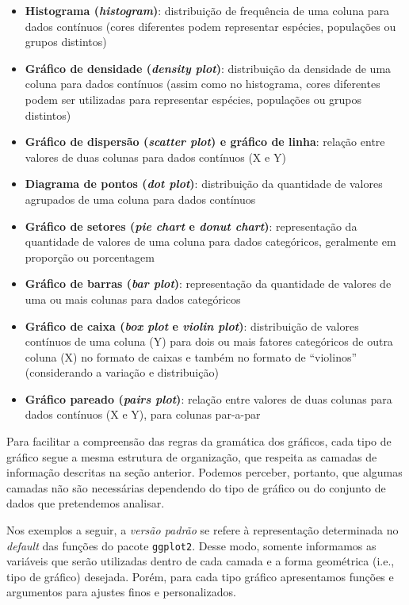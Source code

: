 \documentclass[
]{article}
\providecommand{\tightlist}{%
  \setlength{\itemsep}{0pt}\setlength{\parskip}{0pt}}
\begin{document}
\begin{itemize}
\tightlist
\item
  \textbf{Histograma (\emph{histogram})}: distribuição de frequência de uma coluna para dados contínuos (cores diferentes podem representar espécies, populações ou grupos distintos)
\item
  \textbf{Gráfico de densidade (\emph{density plot})}: distribuição da densidade de uma coluna para dados contínuos (assim como no histograma, cores diferentes podem ser utilizadas para representar espécies, populações ou grupos distintos)
\item
  \textbf{Gráfico de dispersão (\emph{scatter plot}) e gráfico de linha}: relação entre valores de duas colunas para dados contínuos (X e Y)
\item
  \textbf{Diagrama de pontos (\emph{dot plot})}: distribuição da quantidade de valores agrupados de uma coluna para dados contínuos
\item
  \textbf{Gráfico de setores (\emph{pie chart} e \emph{donut chart})}: representação da quantidade de valores de uma coluna para dados categóricos, geralmente em proporção ou porcentagem
\item
  \textbf{Gráfico de barras (\emph{bar plot})}: representação da quantidade de valores de uma ou mais colunas para dados categóricos
\item
  \textbf{Gráfico de caixa (\emph{box plot} e \emph{violin plot})}: distribuição de valores contínuos de uma coluna (Y) para dois ou mais fatores categóricos de outra coluna (X) no formato de caixas e também no formato de ``violinos'' (considerando a variação e distribuição)
\item
  \textbf{Gráfico pareado (\emph{pairs plot})}: relação entre valores de duas colunas para dados contínuos (X e Y), para colunas par-a-par
\end{itemize}

Para facilitar a compreensão das regras da gramática dos gráficos, cada tipo de gráfico segue a mesma estrutura de organização, que respeita as camadas de informação descritas na seção anterior. Podemos perceber, portanto, que algumas camadas não são necessárias dependendo do tipo de gráfico ou do conjunto de dados que pretendemos analisar.

Nos exemplos a seguir, a \emph{versão padrão} se refere à representação determinada no \emph{default} das funções do pacote \texttt{ggplot2}. Desse modo, somente informamos as variáveis que serão utilizadas dentro de cada camada e a forma geométrica (i.e., tipo de gráfico) desejada. Porém, para cada tipo gráfico apresentamos funções e argumentos para ajustes finos e personalizados.
\end{document}
